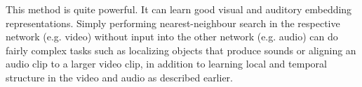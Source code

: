 This method is quite powerful. 
It can learn good visual and auditory embedding representations. 
Simply performing nearest-neighbour search in the respective network (e.g. video) without input into the other network (e.g. audio) can do fairly complex tasks such as localizing objects that produce sounds or aligning an audio clip to a larger video clip, in addition to learning local and temporal structure in the video and audio as described earlier.

